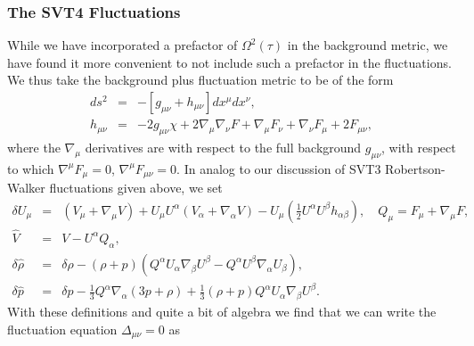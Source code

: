 \subsubsection{The SVT4 Fluctuations}
\label{sss:fluctuations_svt4}

While we have incorporated a prefactor of $\Omega^2(\tau)$ in the background metric, we have found it more convenient to not include such a prefactor in the fluctuations. We thus take the background plus fluctuation metric to be of the form
%
\begin{eqnarray}
ds^2 &=&-[g_{\mu\nu}+h_{\mu\nu}]dx^{\mu}dx^{\nu},
\nonumber\\
 h_{\mu\nu}&=& -2 g_{\mu\nu}\chi + 2\nabla_\mu \nabla_\nu F +\nabla_\mu F_\nu +\nabla_\nu F_\mu+ 2F_{\mu\nu},
\label{12.6}
\end{eqnarray}
%
where the $\nabla_{\mu}$ derivatives are with respect to the full background $g_{\mu\nu}$, with respect to which $\nabla^{\mu}F_{\mu}=0$, $\nabla^{\mu}F_{\mu\nu}=0$. In analog to our discussion of SVT3 Robertson-Walker fluctuations given above, we set
%
\begin{eqnarray}
\delta U_{\mu} &=& (V_\mu + \nabla_\mu V) + U_\mu U^\alpha(V_\alpha + \nabla_\alpha V)-U_\mu\left(\tfrac{1}{2} U^\alpha U^\beta h_{\alpha\beta}\right), \quad Q_\mu = F_\mu + \nabla_\mu F, 
\nonumber\\
\hat{V}&=& V-U^\alpha Q_\alpha,
\nonumber\\
\delta \hat{\rho}{} &=& \delta \rho-(\rho+p)( Q^{\alpha } U_{\alpha } \nabla_{\beta }U^{\beta }-Q^{\alpha } U^{\beta } \nabla_{\alpha }U_{\beta }),
\nonumber\\
\delta \hat{p}{} &=& \delta p - \tfrac{1}{3} Q^{\alpha } \nabla_{\alpha }(3p+\rho) +  \tfrac{1}{3} (\rho+p) Q^{\alpha } U_{\alpha } \nabla_{\beta }U^{\beta }.
\label{12.7}
\end{eqnarray}
%
With these definitions and quite a bit of algebra we find that we can write the fluctuation equation $\Delta_{\mu\nu}=0$ as
%
